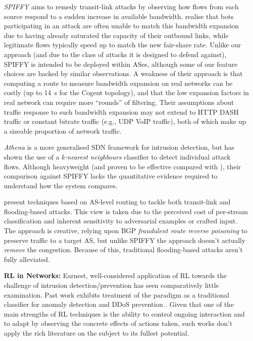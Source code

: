 \documentclass[10pt, times, comsoc]{IEEEtran}
\newcommand{\fakepara}[1]{\noindent\textbf{#1:}}
\begin{document}
\emph{SPIFFY} \cite{DBLP:conf/ndss/KangGS16} aims to remedy transit-link attacks by observing how flows from each source respond to a sudden increase in available bandwidth.
 realise that bots participating in an attack are often unable to match this bandwidth expansion due to having already saturated the capacity of their outbound links, while legitimate flows typically speed up to match the new fair-share rate.
Unlike our approach (and due to the class of attacks it is designed to defend against), SPIFFY is intended to be deployed within ASes, although some of our feature choices are backed by similar observations.
A weakness of their approach is that computing a route to measure bandwidth expansion on real networks can be costly (up to \SI{14}{\second} for the Cogent topology), and that the low expansion factors in real network can require more ``rounds'' of filtering. 
Their assumptions about traffic response to such bandwidth expansion may not extend to HTTP DASH traffic or constant bitrate traffic (e.g., UDP VoIP traffic), both of which make up a sizeable proportion of network traffic.

\emph{Athena} \cite{DBLP:conf/dsn/LeeKSPY17} is a more generalised SDN framework for intrusion detection, but has shown the use of a \emph{k-nearest neighbours} classifier to detect individual attack flows.
Although heavyweight (and proven to be effective compared with \textcite{DBLP:conf/lcn/BragaMP10}), their comparison against SPIFFY lacks the quantitative evidence required to understand how the system compares.

\Textcite{DBLP:conf/sp/SmithS18} present techniques based on AS-level routing to tackle both transit-link and flooding-based attacks.
This view is taken due to the perceived cost of per-stream classification and inherent sensitivity to adversarial examples or crafted input.
The approach is creative, relying upon BGP \emph{fraudulent route reverse poisoning} to preserve traffic to a target AS, but unlike SPIFFY the approach doesn't actually \emph{remove} the congestion.
Because of this, traditional flooding-based attacks aren't fully alleviated.

\fakepara{RL in Networks}
Earnest, well-considered application of RL towards the challenge of intrusion detection/prevention has seen comparatively little examination.
Past work exhibits treatment of the paradigm as a traditional classifier for anomaly detection \cite{shamshirband2014anomaly} and DDoS prevention \cite{DBLP:conf/mates/ServinK08}.
Given that one of the main strengths of RL techniques is the ability to control ongoing interaction and to adapt by observing the concrete effects of actions taken, such works don't apply the rich literature on the subject to its fullest potential.
\end{document}
